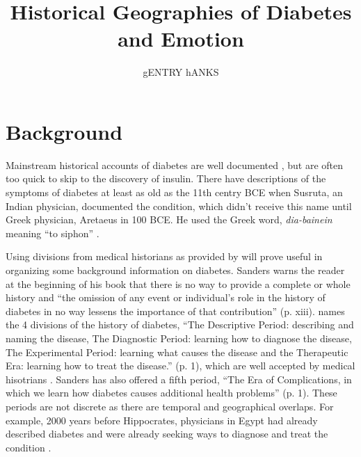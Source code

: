 \documentclass[12pt]{article}
\title{Historical Geographies of Diabetes and Emotion}
\author{gENTRY hANKS}
\begin{document}
\maketitle



\newpage
\section{Background}
\doublespacing
Mainstream historical accounts of diabetes are well documented \citep{engelhardt_diabetes_1989, tattersall_diabetes_2009}, but are often too quick to skip to the discovery of insulin. There have descriptions of the symptoms of diabetes at least as old as the 11th centry BCE when Susruta, an Indian physician, documented the condition, which didn't receive this name until Greek physician, Aretaeus in 100 BCE. He used the Greek word, \textit {dia-bainein} meaning ``to siphon'' \citep{sattley_history_1996}.  

Using divisions from medical historians as provided by \citet{sanders_2001_philatelic} will prove useful in organizing some background information on diabetes. Sanders warns the reader at the beginning of his book that there is no way to provide a complete or whole history and ``the omission of any event or individual's role in the history of diabetes in no way lessens the importance of that contribution'' (p. xiii). 
\citet{sanders_2001_philatelic} names the 4 divisions of the history of diabetes, ``The Descriptive Period: describing and naming the disease, The Diagnostic Period: learning how to diagnose the disease, The Experimental Period: learning what causes the disease and the Therapeutic Era: learning how to treat the disease.'' (p. 1), which are well accepted by medical hisotrians \citep{papaspyros_1964_history}. Sanders has also offered a fifth period, ``The Era of Complications, in which we learn how diabetes causes additional health problems'' (p. 1). These periods are not discrete as there are temporal and geographical overlaps. For example, 2000 years before Hippocrates, physicians in Egypt had already described diabetes and were already seeking ways to diagnose and treat the condition \citep{sanders_2001_philatelic}. 
\end{document}
